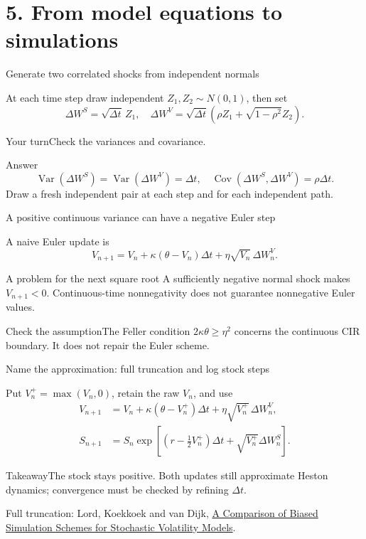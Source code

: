 \documentclass[handout,10pt,t,aspectratio=169]{beamer}
\newenvironment{pausebox}{\begin{block}{Your turn}}{\end{block}}
\newenvironment{answerbox}{\begin{exampleblock}{Answer}}{\end{exampleblock}}
\newenvironment{keybox}{\begin{exampleblock}{Takeaway}}{\end{exampleblock}}
\newenvironment{watchbox}{\begin{alertblock}{Check the assumption}}{\end{alertblock}}
\newcommand{\Var}{\operatorname{Var}}
\newcommand{\Cov}{\operatorname{Cov}}
\newcommand{\source}[1]{\vfill{\scriptsize\color{gray}#1\par}}
\begin{document}
\section{5. From model equations to simulations}

\begin{frame}{Generate two correlated shocks from independent normals}

    At each time step draw independent \(Z_1,Z_2\sim N(0,1)\), then set
    \[\Delta W^S=\sqrt{\Delta t}\,Z_1,\quad
      \Delta W^V=\sqrt{\Delta t}\left(\rho Z_1+\sqrt{1-\rho^2}Z_2\right).\]
    \begin{pausebox}Check the variances and covariance.\end{pausebox}
    \begin{answerbox}
    \[\Var(\Delta W^S)=\Var(\Delta W^V)=\Delta t,\quad
       \Cov(\Delta W^S,\Delta W^V)=\rho\Delta t.\]
    Draw a fresh independent pair at each step and for each independent path.
    \end{answerbox}
\end{frame}

\begin{frame}{A positive continuous variance can have a negative Euler step}

    A naive Euler update is
    \[V_{n+1}=V_n+\kappa(\theta-V_n)\Delta t
                 +\eta\sqrt{V_n}\,\Delta W_n^V.\]
    \begin{block}{A problem for the next square root}
    A sufficiently negative normal shock makes \(V_{n+1}<0\).
    Continuous-time nonnegativity does not guarantee nonnegative Euler values.
    \end{block}
    \begin{watchbox}The Feller condition \(2\kappa\theta\geq\eta^2\)
    concerns the continuous CIR boundary. It does not repair the Euler scheme.\end{watchbox}
\end{frame}

\begin{frame}{Name the approximation: full truncation and log stock steps}

    Put \(V_n^+=\max(V_n,0)\), retain the raw \(V_n\), and use
    \[\begin{aligned}
    V_{n+1}&=V_n+\kappa(\theta-V_n^+)\Delta t
                     +\eta\sqrt{V_n^+}\,\Delta W_n^V,\\
    S_{n+1}&=S_n\exp\!\left[(r-\tfrac12V_n^+)\Delta t
                              +\sqrt{V_n^+}\Delta W_n^S\right].
    \end{aligned}\]
    \begin{keybox}The stock stays positive. Both updates still approximate
    Heston dynamics; convergence must be checked by refining \(\Delta t\).\end{keybox}
    \source{Full truncation: Lord, Koekkoek and van Dijk, \href{https://repub.eur.nl/pub/7738}{A Comparison of Biased Simulation Schemes for Stochastic Volatility Models}.}
\end{frame}
\end{document}
